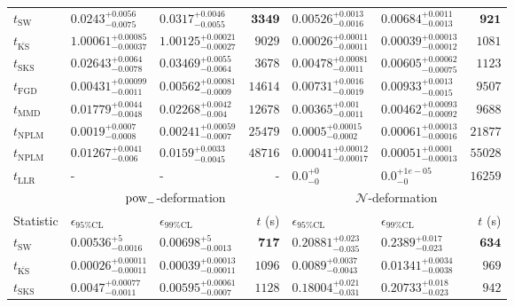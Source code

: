 \begin{tabular}{l|llr|llr}
	\midrule
	$t_{\mathrm{SW}}$ & $0.0243_{-0.0075}^{+0.0056}$ & $0.0317_{-0.0055}^{+0.0046}$ & ${\mathbf{3349}}$ & $0.00526_{-0.0016}^{+0.0013}$ & $0.00684_{-0.0013}^{+0.0011}$ & ${\mathbf{921}}$ \\
	$t_{\overline{\mathrm{KS}}}$ & $1.00061_{-0.00037}^{+0.00085}$ & $1.00125_{-0.00027}^{+0.00021}$ & $9029$ & ${\mathbf{0.00026_{-0.00011}^{+0.00011}}}$ & ${\mathbf{0.00039_{-0.00012}^{+0.00013}}}$ & $1081$ \\
	$t_{\mathrm{SKS}}$ & $0.02643_{-0.0078}^{+0.0064}$ & $0.03469_{-0.0064}^{+0.0055}$ & $3678$ & $0.00478_{-0.0011}^{+0.00081}$ & $0.00605_{-0.00075}^{+0.00062}$ & $1123$ \\
	$t_{\mathrm{FGD}}$ & ${\mathbf{0.00431_{-0.0011}^{+0.00099}}}$ & ${\mathbf{0.00562_{-0.0009}^{+0.00081}}}$ & $14614$ & $0.00731_{-0.0019}^{+0.0016}$ & $0.00933_{-0.0015}^{+0.0013}$ & $9507$ \\
	$t_{\mathrm{MMD}}$ & $0.01779_{-0.0048}^{+0.0044}$ & $0.02268_{-0.004}^{+0.0042}$ & $12678$ & $0.00365_{-0.0011}^{+0.001}$ & $0.00462_{-0.00092}^{+0.00093}$ & $9688$ \\
\rowcolor{red!35}	$t_{\mathrm{NPLM}}$ & $0.0019_{-0.0008}^{+0.0007}$ & $0.00241_{-0.0007}^{+0.00059}$ & $25479$ & $0.0005_{-0.0002}^{+0.00015}$ & $0.00061_{-0.00016}^{+0.00013}$ & $21877$ \\
\rowcolor{blue!35}	$t_{\mathrm{NPLM}}$ & $0.01267_{-0.006}^{+0.0041}$ & $0.0159_{-0.0045}^{+0.0033}$ & $48716$ & $0.00041_{-0.00017}^{+0.00012}$ & $0.00051_{-0.00013}^{+0.0001}$ & $55028$ \\
	$t_{\mathrm{LLR}}$ & - & - & - & $0.0_{-0}^{+0}$ & $0.0_{-0}^{+1e-05}$ & $16259$ \\
	\toprule
	\multicolumn{1}{c}{} & \multicolumn{3}{c}{$\rm{pow}_{-}$-deformation} & \multicolumn{3}{c}{$\mathcal{N}$-deformation} \\
	Statistic & $\epsilon_{95\%\mathrm{CL}}$ & $\epsilon_{99\%\mathrm{CL}}$ & $t$ (s) & $\epsilon_{95\%\mathrm{CL}}$ & $\epsilon_{99\%\mathrm{CL}}$ & $t$ (s) \\
	\midrule
	$t_{\mathrm{SW}}$ & $0.00536_{-0.0016}^{+5}$ & $0.00698_{-0.0013}^{+5}$ & ${\mathbf{717}}$ & $0.20881_{-0.035}^{+0.023}$ & $0.2389_{-0.023}^{+0.017}$ & ${\mathbf{634}}$ \\
	$t_{\overline{\mathrm{KS}}}$ & ${\mathbf{0.00026_{-0.00011}^{+0.00011}}}$ & ${\mathbf{0.00039_{-0.00011}^{+0.00013}}}$ & $1096$ & ${\mathbf{0.0089_{-0.0043}^{+0.0037}}}$ & ${\mathbf{0.01341_{-0.0038}^{+0.0034}}}$ & $969$ \\
	$t_{\mathrm{SKS}}$ & $0.0047_{-0.0011}^{+0.00077}$ & $0.00595_{-0.0007}^{+0.00061}$ & $1128$ & $0.18004_{-0.031}^{+0.021}$ & $0.20733_{-0.023}^{+0.018}$ & $942$ \\

\end{tabular}
